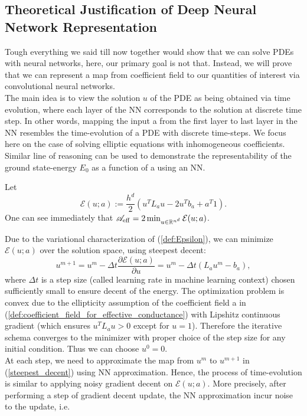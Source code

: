\subsection{Theoretical Justification of Deep Neural Network Representation}
Tough everything we said till now together would show that we can solve PDEs with neural networks, here, our primary goal is not that. Instead, we will prove that we can represent a map from coefficient field to our quantities of interest via convolutional neural networks.\\
The main idea is to view the solution $u$ of the PDE as being obtained via time evolution, where each layer of the NN corresponds to the solution at discrete time step. In other words, mapping the input a from the first layer to last layer in the NN resembles the time-evolution of a PDE with discrete time-steps. We focus here on the case of solving elliptic equations with inhomogeneous coefficients. Similar line of reasoning can be used to demonstrate the representability of the ground state-energy $E_0$ as a function of a using an NN.
\begin{assumption}
	Let 
	\begin{equation}
		\label{def:Epsilon}
		\mathcal{E}(u;a) := \frac{h^d}{2} (u^T L_a u - 2u^T b_a + a^T 1).
	\end{equation} 
	One can see immediately that $\mathscr{A}_{\operatorname{eff}} = 2 \min_{u\in \mathbb{R}^{n^d}} \mathcal{E}(u;a)$.
\end{assumption} 
Due to the variational characterization of (\ref{def:Epsilon}), we can minimize $\mathcal{E}(u;a)$ over the solution space, using steepest decent:
\begin{equation}
	\label{steepest_decent}
	u^{m+1} = u^m - \Delta t \frac{\partial \mathcal{E}(u;a)}{\partial u} = u^m - \Delta t( L_a u^m - b_a),
\end{equation}
where $\Delta t$ is a step size (called learning rate in machine learning context) chosen sufficiently small to ensure decent of the energy. The optimization problem is convex due to the ellipticity assumption of the coefficient field a in (\ref{def:coefficient_field_for_effective_conductance}) with Lipshitz continuous gradient (which ensures $u^T L_a u > 0$ except for $u=1$). Therefore the iterative schema converges to the minimizer with proper choice of the step size for any initial condition. Thus we can choose $u^0 = 0$.\\
At each step, we need to approximate the map from $u^m$ to $u^{m+1}$ in (\ref{steepest_decent}) using NN approximation. Hence, the process of time-evolution is similar to applying noisy gradient decent on $\mathcal{E}(u;a)$. More precisely, after performing a step of gradient decent update, the NN approximation incur noise to the update, i.e.
